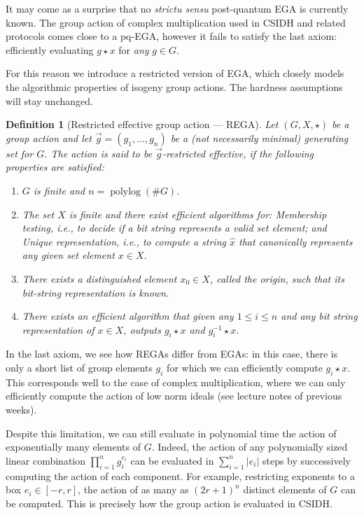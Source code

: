 \documentclass{article}
\newtheorem{defi}{Definition}
\DeclareMathOperator{\polylog}{polylog}
\begin{document}
It may come as a surprise that no \emph{strictu sensu} post-quantum
EGA is currently known.  The group action of complex multiplication
used in CSIDH and related protocols comes close to a pq-EGA, however
it fails to satisfy the last axiom: efficiently evaluating $g\star x$
for \emph{any} $g\in G$.

For this reason we introduce a restricted version of EGA, which
closely models the algorithmic properties of isogeny group actions.
The hardness assumptions will stay unchanged.

\begin{defi}[Restricted effective group action --- REGA]
  Let $(G,X,\star )$ be a group action and let $\vec{g} =(g_1,\ldots,g_n)$
  be a (not necessarily minimal) generating set for $G$.  The action
  is said to be \emph{$\vec{g}$-restricted effective}, if the
  following properties are satisfied:
  \begin{enumerate}
  \item $G$ is finite and $n = \polylog(\# G)$.
  \item The set $X$ is finite and there exist efficient algorithms
    for: \emph{Membership testing}, i.e., to decide if a bit string
    represents a valid set element; and \emph{Unique representation},
    i.e., to compute a string $\hat{x}$ that canonically represents
    any given set element $x\in X$.
  \item There exists a distinguished element $x_0\in X$, called the
    \emph{origin}, such that its bit-string representation is known.
  \item There exists an efficient algorithm that given any
    $1\le i\le n$ and any bit string representation of $x\in X$,
    outputs $g_i\star x$ and $g_i^{-1}\star x$.
  \end{enumerate}
\end{defi}

In the last axiom, we see how REGAs differ from EGAs: in this case,
there is only a short list of group elements $g_i$ for which we can
efficiently compute $g_i\star x$.  This corresponds well to the case
of complex multiplication, where we can only efficiently compute the
action of low norm ideals (see lecture notes of previous weeks).

Despite this limitation, we can still evaluate in polynomial time the
action of exponentially many elements of $G$.  Indeed, the action of
any polynomially sized linear combination $\prod_{i=1}^n g_i^{e_i}$
can be evaluated in $\sum_{i=1}^n |e_i|$ steps by successively
computing the action of each component.  For example, restricting
exponents to a box $e_i\in [-r,r]$, the action of as many as
$(2r+1)^n$ distinct elements of $G$ can be computed.  This is
precisely how the group action is evaluated in CSIDH.
\end{document}

